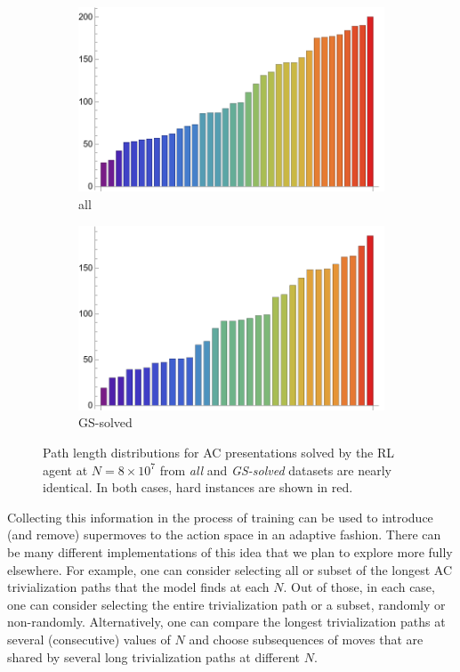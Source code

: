 \begin{figure}[h]
	\centering
	\begin{subfigure}{0.45\textwidth}
		\centering
		\includegraphics[width=\textwidth]{fig/all_path_length_80M.png}
		\caption{all}
		\label{fig:all_path_length_80M}
	\end{subfigure}
	\hfill
	\begin{subfigure}{0.45\textwidth}
		\centering
		\includegraphics[width=\textwidth]{fig/solved_path_length_80M.png}
		\caption{GS-solved}
		\label{fig:solved_path_length_80M}
	\end{subfigure}
	\caption{Path length distributions for AC presentations solved by the RL agent at $N=8 \times 10^7$ from \textit{all} and \textit{GS-solved} datasets are nearly identical. In both cases, hard instances are shown in red.}
	\label{fig:path_length_80M}
\end{figure}

Collecting this information in the process of training can be used to introduce (and remove) supermoves to the action space in an adaptive fashion. There can be many different implementations of this idea that we plan to explore more fully elsewhere. For example, one can consider selecting all or subset of the longest AC trivialization paths that the model finds at each $N$. Out of those, in each case, one can consider selecting the entire trivialization path or a subset, randomly or non-randomly. Alternatively, one can compare the longest trivialization paths at several (consecutive) values of $N$ and choose subsequences of moves that are shared by several long trivialization paths at different $N$.

